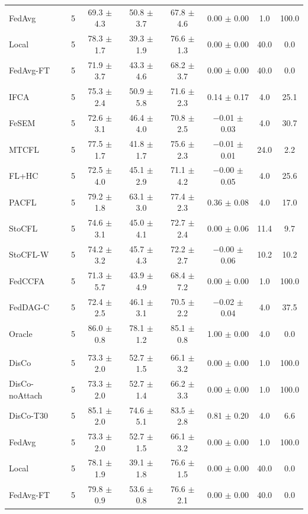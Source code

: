 {{\begin{tabular}{l r c c c c c c}
FedAvg & 5 & 69.3 $\pm$ 4.3 & 50.8 $\pm$ 3.7 & 67.8 $\pm$ 4.6 & 0.00 $\pm$ 0.00 & 1.0 & 100.0 \\
Local & 5 & 78.3 $\pm$ 1.7 & 39.3 $\pm$ 1.9 & 76.6 $\pm$ 1.3 & 0.00 $\pm$ 0.00 & 40.0 & 0.0 \\
FedAvg-FT & 5 & 71.9 $\pm$ 3.7 & 43.3 $\pm$ 4.6 & 68.2 $\pm$ 3.7 & 0.00 $\pm$ 0.00 & 40.0 & 0.0 \\
IFCA & 5 & 75.3 $\pm$ 2.4 & 50.9 $\pm$ 5.8 & 71.6 $\pm$ 2.3 & 0.14 $\pm$ 0.17 & 4.0 & 25.1 \\
FeSEM & 5 & 72.6 $\pm$ 3.1 & 46.4 $\pm$ 4.0 & 70.8 $\pm$ 2.5 & $-$0.01 $\pm$ 0.03 & 4.0 & 30.7 \\
MTCFL & 5 & 77.5 $\pm$ 1.7 & 41.8 $\pm$ 1.7 & 75.6 $\pm$ 2.3 & $-$0.01 $\pm$ 0.01 & 24.0 & 2.2 \\
FL+HC & 5 & 72.5 $\pm$ 4.0 & 45.1 $\pm$ 2.9 & 71.1 $\pm$ 4.2 & $-$0.00 $\pm$ 0.05 & 4.0 & 25.6 \\
PACFL & 5 & 79.2 $\pm$ 1.8 & 63.1 $\pm$ 3.0 & 77.4 $\pm$ 2.3 & 0.36 $\pm$ 0.08 & 4.0 & 17.0 \\
StoCFL & 5 & 74.6 $\pm$ 3.1 & 45.0 $\pm$ 4.1 & 72.7 $\pm$ 2.4 & 0.00 $\pm$ 0.06 & 11.4 & 9.7 \\
StoCFL-W & 5 & 74.2 $\pm$ 3.2 & 45.7 $\pm$ 4.3 & 72.2 $\pm$ 2.7 & $-$0.00 $\pm$ 0.06 & 10.2 & 10.2 \\
FedCCFA & 5 & 71.3 $\pm$ 5.7 & 43.9 $\pm$ 4.9 & 68.4 $\pm$ 7.2 & 0.00 $\pm$ 0.00 & 1.0 & 100.0 \\
FedDAG-C & 5 & 72.4 $\pm$ 2.5 & 46.1 $\pm$ 3.1 & 70.5 $\pm$ 2.2 & $-$0.02 $\pm$ 0.04 & 4.0 & 37.5 \\
Oracle & 5 & 86.0 $\pm$ 0.8 & 78.1 $\pm$ 1.2 & 85.1 $\pm$ 0.8 & 1.00 $\pm$ 0.00 & 4.0 & 0.0 \\
\addlinespace
\multicolumn{8}{l}{\textit{SVHN label swap}} \\
DisCo & 5 & 73.3 $\pm$ 2.0 & 52.7 $\pm$ 1.5 & 66.1 $\pm$ 3.2 & 0.00 $\pm$ 0.00 & 1.0 & 100.0 \\
DisCo-noAttach & 5 & 73.3 $\pm$ 2.0 & 52.7 $\pm$ 1.4 & 66.2 $\pm$ 3.3 & 0.00 $\pm$ 0.00 & 1.0 & 100.0 \\
DisCo-T30 & 5 & 85.1 $\pm$ 2.0 & 74.6 $\pm$ 5.1 & 83.5 $\pm$ 2.8 & 0.81 $\pm$ 0.20 & 4.0 & 6.6 \\
FedAvg & 5 & 73.3 $\pm$ 2.0 & 52.7 $\pm$ 1.5 & 66.1 $\pm$ 3.2 & 0.00 $\pm$ 0.00 & 1.0 & 100.0 \\
Local & 5 & 78.1 $\pm$ 1.9 & 39.1 $\pm$ 1.8 & 76.6 $\pm$ 1.5 & 0.00 $\pm$ 0.00 & 40.0 & 0.0 \\
FedAvg-FT & 5 & 79.8 $\pm$ 0.9 & 53.6 $\pm$ 0.8 & 76.6 $\pm$ 2.1 & 0.00 $\pm$ 0.00 & 40.0 & 0.0 \\

\end{tabular}}}
